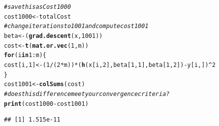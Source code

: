 \documentclass[12pt, a4paper, oneside]{article}\usepackage[]{graphicx}\usepackage[]{color}
\makeatletter
\newcommand{\hlnum}[1]{\textcolor[rgb]{0.686,0.059,0.569}{#1}}%
\newcommand{\hlcom}[1]{\textcolor[rgb]{0.678,0.584,0.686}{\textit{#1}}}%
\newcommand{\hlopt}[1]{\textcolor[rgb]{0,0,0}{#1}}%
\newcommand{\hlstd}[1]{\textcolor[rgb]{0.345,0.345,0.345}{#1}}%
\newcommand{\hlkwa}[1]{\textcolor[rgb]{0.161,0.373,0.58}{\textbf{#1}}}%
\newcommand{\hlkwb}[1]{\textcolor[rgb]{0.69,0.353,0.396}{#1}}%
\newcommand{\hlkwd}[1]{\textcolor[rgb]{0.737,0.353,0.396}{\textbf{#1}}}%
\newenvironment{kframe}{%
 \def\at@end@of@kframe{}%
 \ifinner\ifhmode%
  \def\at@end@of@kframe{\end{minipage}}%
  \begin{minipage}{\columnwidth}%
 \fi\fi%
 \def\FrameCommand##1{\hskip\@totalleftmargin \hskip-\fboxsep
 \colorbox{shadecolor}{##1}\hskip-\fboxsep
     \hskip-\linewidth \hskip-\@totalleftmargin \hskip\columnwidth}%
 \MakeFramed {\advance\hsize-\width
   \@totalleftmargin\z@ \linewidth\hsize
   \@setminipage}}%
 {\par\unskip\endMakeFramed%
 \at@end@of@kframe}
\newenvironment{knitrout}{}{} %
\makeatother
\begin{document}
\begin{knitrout}
\begin{kframe}
\begin{verbatim}
\end{verbatim}
\begin{alltt}
\hlcom{# save this as Cost1000}
\hlstd{cost1000} \hlkwb{<-} \hlstd{totalCost}
\hlcom{# change iterations to 1001 and compute cost1001}
\hlstd{beta} \hlkwb{<-} \hlstd{(}\hlkwd{grad.descent}\hlstd{(x,} \hlnum{1001}\hlstd{))}
\hlstd{cost} \hlkwb{<-} \hlkwd{t}\hlstd{(}\hlkwd{mat.or.vec}\hlstd{(}\hlnum{1}\hlstd{, m))}
\hlkwa{for} \hlstd{(i} \hlkwa{in} \hlnum{1}\hlopt{:}\hlstd{m) \{}
    \hlstd{cost[i,} \hlnum{1}\hlstd{]} \hlkwb{<-} \hlstd{(}\hlnum{1}\hlopt{/}\hlstd{(}\hlnum{2} \hlopt{*} \hlstd{m))} \hlopt{*} \hlstd{(}\hlkwd{h}\hlstd{(x[i,} \hlnum{2}\hlstd{], beta[}\hlnum{1}\hlstd{,} \hlnum{1}\hlstd{], beta[}\hlnum{1}\hlstd{,} \hlnum{2}\hlstd{])} \hlopt{-} \hlstd{y[i, ])}\hlopt{^}\hlnum{2}
\hlstd{\}}
\hlstd{cost1001} \hlkwb{<-} \hlkwd{colSums}\hlstd{(cost)}
\hlcom{# does this difference meet your convergence criteria?}
\hlkwd{print}\hlstd{(cost1000} \hlopt{-} \hlstd{cost1001)}
\end{alltt}
\begin{verbatim}
## [1] 1.515e-11
\end{verbatim}
\end{kframe}
\end{knitrout}
\end{document}
